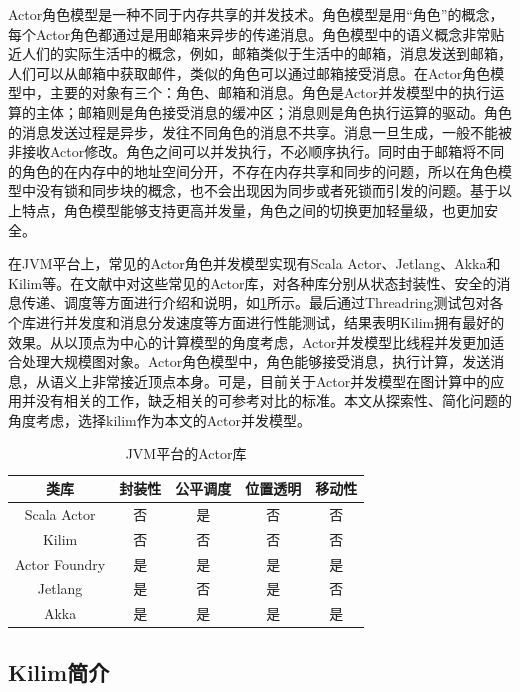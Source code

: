 Actor角色模型是一种不同于内存共享的并发技术。角色模型是用“角色”的概念，每个Actor角色都通过是用邮箱来异步的传递消息。角色模型中的语义概念非常贴近人们的实际生活中的概念，例如，邮箱类似于生活中的邮箱，消息发送到邮箱，人们可以从邮箱中获取邮件，类似的角色可以通过邮箱接受消息。在Actor角色模型中，主要的对象有三个：角色、邮箱和消息。角色是Actor并发模型中的执行运算的主体；邮箱则是角色接受消息的缓冲区；消息则是角色执行运算的驱动。角色的消息发送过程是异步，发往不同角色的消息不共享。消息一旦生成，一般不能被非接收Actor修改。角色之间可以并发执行，不必顺序执行。同时由于邮箱将不同的角色的在内存中的地址空间分开，不存在内存共享和同步的问题，所以在角色模型中没有锁和同步块的概念，也不会出现因为同步或者死锁而引发的问题。基于以上特点，角色模型能够支持更高并发量，角色之间的切换更加轻量级，也更加安全。

在JVM平台上，常见的Actor角色并发模型实现有Scala Actor、Jetlang、Akka和Kilim等。在文献中对这些常见的Actor库，对各种库分别从状态封装性、安全的消息传递、调度等方面进行介绍和说明，如\ref{table:actors}所示。最后通过Threadring测试包对各个库进行并发度和消息分发速度等方面进行性能测试，结果表明Kilim拥有最好的效果。从以顶点为中心的计算模型的角度考虑，Actor并发模型比线程并发更加适合处理大规模图对象。Actor角色模型中，角色能够接受消息，执行计算，发送消息，从语义上非常接近顶点本身。可是，目前关于Actor并发模型在图计算中的应用并没有相关的工作，缺乏相关的可参考对比的标准。本文从探索性、简化问题的角度考虑，选择kilim作为本文的Actor并发模型。

\begin{table}[htbp]
\caption{JVM平台的Actor库}\label{table:actors}
\vspace{0.5em}\centering\wuhao
\begin{tabular}{|c|c|c|c|c|}
\toprule[1.5pt]
类库 & 封装性   & 公平调度   & 位置透明 & 移动性  \\
\midrule[1pt]
Scala Actor & 否 &是& 否 & 否\\
Kilim & 否 & 否 & 否 & 否\\
Actor Foundry & 是 & 是& 是 & 是\\
Jetlang & 是 & 否 & 是 &  否 \\
Akka &  是 & 是& 是 & 是\\
\bottomrule[1.5pt]
\end{tabular}
\vspace{\baselineskip}
\end{table}


\subsection{Kilim简介}

